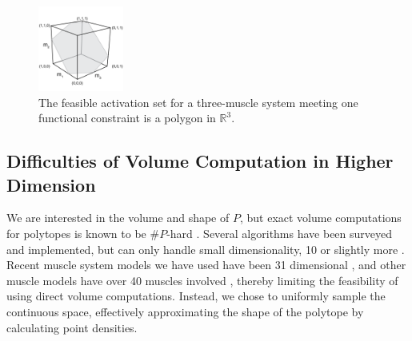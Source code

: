 \begin{figure}[t]
  \label{fig:fig_hr}
   \begin{center}
    \includegraphics[width=0.25\textwidth]{sections/figs/feasibleactivation.png}
  \end{center}
  \caption{The feasible activation set for a  three-muscle system meeting one functional constraint is a polygon in $\mathbb{R}^3$.} %
\end{figure}

\subsection*{Difficulties of Volume Computation in Higher Dimension}

We are interested in the volume and shape of $P$, but exact volume computations for polytopes is known to be $\#P$-hard \cite{Dyer}.
Several algorithms have been surveyed and implemented, but can only handle small dimensionality, 10 or slightly more \cite{Bueler2}.  
Recent muscle system models we have used have been 31 dimensional \cite{Valero-Cuevas2015high-dimensional}, and other muscle models have over 40 muscles involved \cite{arnold2010model, kutch2012challenges, hamner2010muscle, de2014human}, thereby limiting the feasibility of using direct volume computations. Instead, we chose to uniformly sample the continuous space, effectively approximating the shape of the polytope by calculating point densities.

